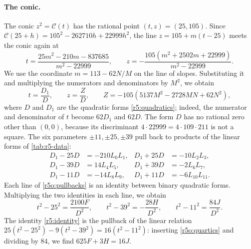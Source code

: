\paragraph{The conic.} The conic $z^2=\mathcal C(t)$ has the rational point $(t,z)=(25,105)$. Since $\mathcal C(25+h)=105^2-262710h+22999h^2$, the line $z=105+m(t-25)$ meets the conic again at
\[
t=\frac{25m^2-210m-837685}{m^2-22999},\qquad z=-\frac{105(m^2+2502m+22999)}{m^2-22999}.
\]
We use the coordinate $m=113-62N/M$ on the line of slopes. Substituting it and multiplying the numerators and denominators by $M^2$, we obtain
\begin{equation}\label{r5o:param}
t=\frac{D_1}D,\qquad z=\frac ZD,\qquad Z=-105(5137M^2-2728MN+62N^2),
\end{equation}
where $D$ and $D_1$ are the quadratic forms \eqref{r5:quadratics}; indeed, the numerator and denominator of $t$ become $62D_1$ and $62D$. The form $D$ has no rational zero other than $(0,0)$, because its discriminant $4\cdot22999=4\cdot109\cdot211$ is not a square. The six parameters $\pm11,\pm25,\pm39$ pull back to products of the linear forms of \cref{tab:r5-data}:
\begin{equation}\label{r5o:pullbacks}
\begin{aligned}
D_1-25D&=-210L_0L_1, & D_1+25D&=-10L_2L_3,\\
D_1-39D&=14L_4L_5, & D_1+39D&=-2L_6L_7,\\
D_1-11D&=-14L_8L_9, & D_1+11D&=-6L_{10}L_{11}.
\end{aligned}
\end{equation}
Each line of \eqref{r5o:pullbacks} is an identity between binary quadratic forms. Multiplying the two identities in each line, we obtain
\begin{equation}\label{r5o:quartics}
t^2-25^2=\frac{2100F}{D^2},\qquad t^2-39^2=-\frac{28H}{D^2},\qquad t^2-11^2=\frac{84J}{D^2}.
\end{equation}
The identity \eqref{r5:identity} is the pullback of the linear relation $25(t^2-25^2)-9(t^2-39^2)=16(t^2-11^2)$: inserting \eqref{r5o:quartics} and dividing by $84$, we find $625F+3H=16J$.

